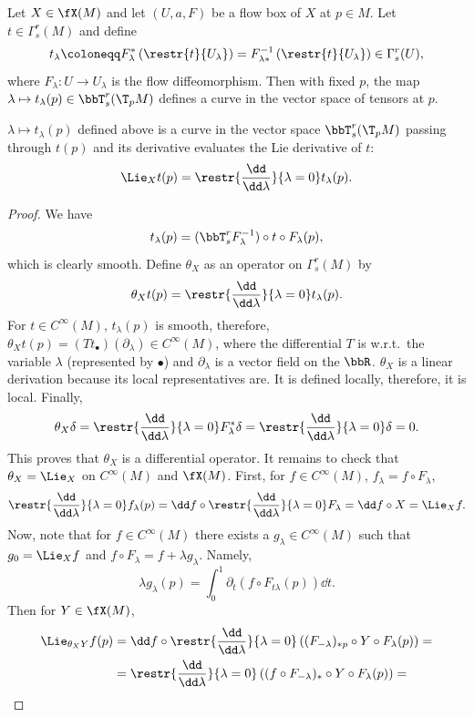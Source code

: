 Let $X\in \fX(M)$ and let $(U,a,F)$ be a flow box of $X$ at $p\in M$. Let $t\in\Gamma^r_s(M)$ and define
\[t_\lambda\coloneqq F_{\lambda}^\ast \left(\restr{t}{U_\lambda}\right)=F_{\lambda\ast}^{-1} \left(\restr{t}{U_\lambda}\right)\in\Gamma^r_s(U),\]
where $F_\lambda :U\to U_\lambda$ is the flow diffeomorphism. Then with fixed $p$, the map $\lambda\mapsto t_\lambda (p) \in \bbT^r_s (\T_p M)$ defines a curve in the vector space of tensors at $p$.
\begin{thm}
    $\lambda\mapsto t_\lambda (p)$ defined above is a curve in the vector space $\bbT^r_s (\T_p M)$ passing through $t(p)$ and its derivative evaluates the Lie derivative of $t$:
    \[\Lie_X t(p)=\restr{\frac{\dd}{\dd \lambda}}{\lambda=0}t_\lambda(p).\]
\end{thm}
\begin{proof}
    We have 
    \[t_\lambda(p)=(\bbT^r_s F_\lambda^{-1})\circ t \circ F_\lambda(p),\] 
    which is clearly smooth.
    Define $\theta_X$ as an operator on $\Gamma^r_s(M)$ by 
    \[\theta_X t(p)=\restr{\frac{\dd}{\dd \lambda}}{\lambda=0} t_\lambda(p).\]
    For $t\in C^\infty(M)$, $t_\lambda(p)$ is smooth, therefore, $\theta_X t(p)=(Tt_\bullet)(\partial_\lambda)\in C^\infty(M)$, where the differential $T$ is w.r.t.\ the variable $\lambda$ (represented by $\bullet$) and  $\partial_\lambda$ is a vector field on the $\bbR $. $\theta_X$ is a linear derivation because its local representatives are. It is defined locally, therefore, it is local. Finally, 
    \[\theta_X\delta=\restr{\frac{\dd}{\dd \lambda}}{\lambda=0} F^\ast_\lambda \delta=\restr{\frac{\dd}{\dd \lambda}}{\lambda=0}\delta=0.\] 
    This proves that $\theta_X$ is a differential operator. It remains to check that $\theta_X=\Lie_X$ on $C^\infty(M)$ and $\fX(M)$. First, for $f\in C^\infty(M)$, 
    $f_\lambda=f\circ F_\lambda$, 
    \[\restr{\frac{\dd}{\dd \lambda}}{\lambda=0}f_\lambda(p)=\dd f\circ \restr{\frac{\dd}{\dd \lambda}}{\lambda=0}F_\lambda=\dd f\circ X=\Lie_X f.\]
    Now, note that for $f\in C^\infty(M)$ there exists a $g_\lambda\in C^\infty(M)$ such that $g_0=\Lie_X f$ and $f\circ F_\lambda=f+\lambda g_\lambda$. Namely, 
    \[\lambda g_\lambda (p)=\int_0^1 \partial_t(f\circ F_{t\lambda}(p))\dd t.\] 
    Then for $Y\in\fX(M)$,
    \begin{align}
        \Lie_{\theta_X Y}f(p)&=\dd f\circ \restr{\frac{\dd}{\dd \lambda}}{\lambda=0} \left((F_{-\lambda})_{\ast p}\circ Y\circ F_\lambda(p)\right)=\\
        &=\restr{\frac{\dd}{\dd \lambda}}{\lambda=0}\left((f\circ F_{-\lambda})_\ast\circ Y\circ F_\lambda(p)\right)=\\

\end{align}
\end{proof}
